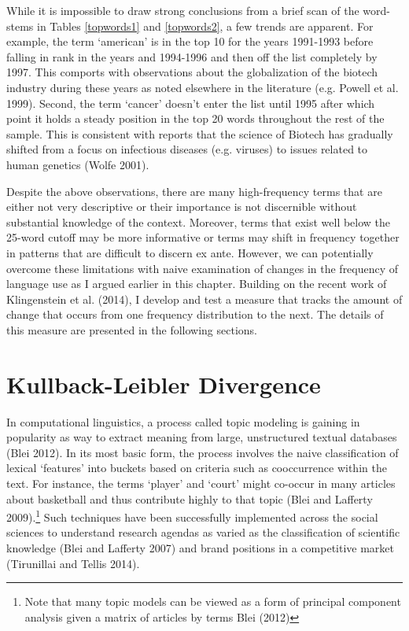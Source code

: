 While it is impossible to draw strong conclusions from a brief scan of the word-stems in Tables \ref{topwords1} and \ref{topwords2}, a few trends are apparent. For example, the  term `american' is in the top 10 for the years 1991-1993 before falling in rank in the years and 1994-1996 and then off the list completely by 1997. This comports with observations about the globalization of the biotech industry during these years as noted elsewhere in the literature (e.g. Powell et al. 1999). Second, the term `cancer' doesn't enter the list until 1995 after which point it holds a steady position in the top 20 words throughout the rest of the sample. This is consistent with reports that the science of Biotech has gradually shifted from a focus on infectious diseases (e.g. viruses) to issues related to human genetics (Wolfe 2001).

Despite the above observations, there are many high-frequency terms that are either not very descriptive or their importance is not discernible without substantial knowledge of the context. Moreover, terms that exist well below the 25-word cutoff may be more informative or terms may shift in frequency together in patterns that are difficult to discern ex ante. However, we can potentially overcome these limitations with naive examination of changes in the frequency of language use as I argued earlier in this chapter. Building on the recent work of Klingenstein et al. (2014), I develop and test a measure that tracks the amount of change that occurs from one frequency distribution to the next. The details of this measure are presented in the following sections.

\section{Kullback-Leibler Divergence\label{kld}}

In computational linguistics, a process called topic modeling is gaining in popularity as way to extract meaning from large, unstructured textual databases (Blei 2012). In its most basic form, the process involves the naive classification of lexical `features' into buckets based on criteria such as cooccurrence within the text. For instance, the terms `player' and `court' might co-occur in many articles about basketball and thus contribute highly to that topic (Blei and Lafferty 2009).\footnote{Note that many topic models can be viewed as a form of principal component analysis given a matrix of articles by terms Blei (2012)} Such techniques have been successfully implemented across the social sciences to understand research agendas as varied as the classification of scientific knowledge (Blei and Lafferty 2007) and brand positions in a competitive market (Tirunillai and Tellis 2014).

